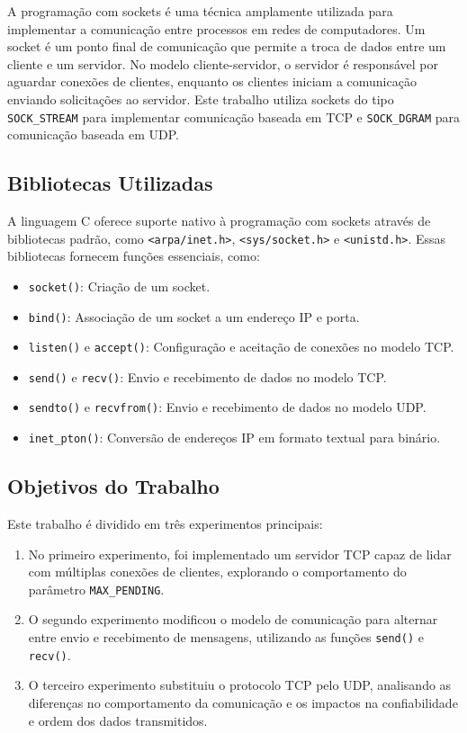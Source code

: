 A programação com sockets é uma técnica amplamente utilizada para implementar a comunicação entre processos em redes de computadores. Um socket é um ponto final de comunicação que permite a troca de dados entre um cliente e um servidor. No modelo cliente-servidor, o servidor é responsável por aguardar conexões de clientes, enquanto os clientes iniciam a comunicação enviando solicitações ao servidor. Este trabalho utiliza sockets do tipo \texttt{SOCK\_STREAM} para implementar comunicação baseada em TCP e \texttt{SOCK\_DGRAM} para comunicação baseada em UDP.

\subsection*{Bibliotecas Utilizadas}

A linguagem C oferece suporte nativo à programação com sockets através de bibliotecas padrão, como \texttt{<arpa/inet.h>}, \texttt{<sys/socket.h>} e \texttt{<unistd.h>}. Essas bibliotecas fornecem funções essenciais, como:
\begin{itemize}
    \item \texttt{socket()}: Criação de um socket.
    \item \texttt{bind()}: Associação de um socket a um endereço IP e porta.
    \item \texttt{listen()} e \texttt{accept()}: Configuração e aceitação de conexões no modelo TCP.
    \item \texttt{send()} e \texttt{recv()}: Envio e recebimento de dados no modelo TCP.
    \item \texttt{sendto()} e \texttt{recvfrom()}: Envio e recebimento de dados no modelo UDP.
    \item \texttt{inet\_pton()}: Conversão de endereços IP em formato textual para binário.
\end{itemize}

\subsection*{Objetivos do Trabalho}

Este trabalho é dividido em três experimentos principais:
\begin{enumerate}
    \item No primeiro experimento, foi implementado um servidor TCP capaz de lidar com múltiplas conexões de clientes, explorando o comportamento do parâmetro \texttt{MAX\_PENDING}.
    \item O segundo experimento modificou o modelo de comunicação para alternar entre envio e recebimento de mensagens, utilizando as funções \texttt{send()} e \texttt{recv()}.
    \item O terceiro experimento substituiu o protocolo TCP pelo UDP, analisando as diferenças no comportamento da comunicação e os impactos na confiabilidade e ordem dos dados transmitidos.
\end{enumerate}

